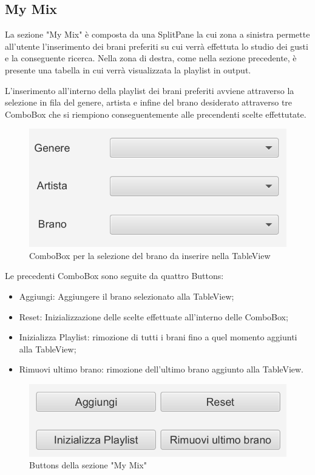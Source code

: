 \documentclass[12pt, a4paper]{article}
\begin{document}
\newpage 
\subsection{My Mix}

La sezione "My Mix" è composta da una SplitPane la cui zona a sinistra permette all'utente l'inserimento dei brani preferiti su cui verrà effettuta lo studio dei gusti e la conseguente ricerca. Nella zona di destra, come nella sezione precedente, è presente una tabella in cui verrà visualizzata la playlist in output.

L'inserimento all'interno della playlist dei brani preferiti avviene attraverso la selezione in fila del genere, artista e infine del brano desiderato attraverso tre ComboBox che si riempiono conseguentemente alle precendenti scelte effettutate.

 \begin{figure}[h]
  \centering
  \includegraphics[width=0.6\linewidth]{images/mymix_combobox.png}
  \caption{ComboBox per la selezione del brano da inserire nella TableView}
\end{figure}

Le precedenti ComboBox sono seguite da quattro Buttons:
\begin{itemize}
\item Aggiungi: Aggiungere il brano selezionato alla TableView;
\item Reset: Inizializzazione delle scelte effettuate all'interno delle ComboBox;
\item Inizializza Playlist: rimozione di tutti i brani fino a quel momento aggiunti alla TableView;
\item Rimuovi ultimo brano: rimozione dell'ultimo brano aggiunto alla TableView.
\end{itemize}

 \begin{figure}[h]
  \centering
  \includegraphics[width=0.6\linewidth]{images/mymix_buttons.png}
  \caption{Buttons della sezione "My Mix"}
\end{figure}
\end{document}
